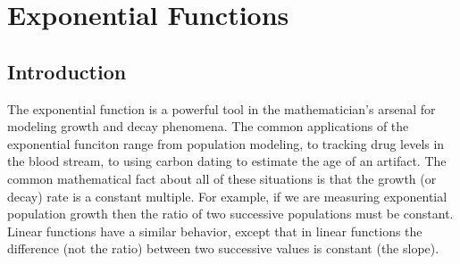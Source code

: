 \section{Exponential Functions} \label{S:0.2.Exponentials}


\vspace*{-14 pt}



\nin \hrulefill


\subsection*{Introduction}
The exponential function is a powerful tool in the mathematician's arsenal for modeling
growth and decay phenomena.  The common applications of the exponential funciton range
from population modeling, to tracking drug levels in the blood stream, to using carbon
dating to estimate the age of an artifact.  The common mathematical fact about all of
these situations is that the growth (or decay) rate is a constant multiple.  For example,
if we are measuring exponential population growth then the ratio of two successive
populations must be constant.  Linear functions have a similar behavior, except that in
linear functions the difference (not the ratio) between two successive values is constant
(the slope).  


